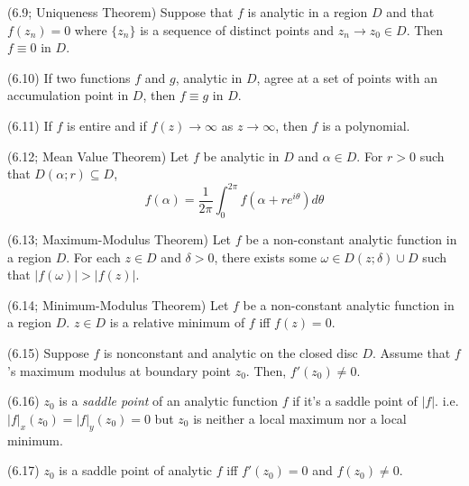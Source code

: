 \documentclass{article}
\begin{document}
\begin{property}(6.9; Uniqueness Theorem)
  Suppose that \(f\) is analytic in a region \(D\) and that \(f(z_n) = 0\)
  where \(\{z_n\}\) is a sequence of distinct points and \(z_n \to z_0 \in D\).
  Then \(f \equiv 0\) in \(D\).
\end{property}
\begin{corollary}(6.10)
  If two functions \(f\) and \(g\), analytic in \(D\),
  agree at a set of points with an accumulation point in \(D\),
  then \(f \equiv g\) in \(D\).
\end{corollary}

\begin{theorem}(6.11)
  If \(f\) is entire and if \(f(z) \to \infty\) as \(z \to \infty\),
  then \(f\) is a polynomial.
\end{theorem}

\begin{theorem}(6.12; Mean Value Theorem)
  Let \(f\) be analytic in \(D\) and \(\alpha \in D\).
  For \(r > 0\) such that \(D(\alpha; r) \subseteq D\),
  \[f(\alpha) = \frac{1}{2\pi}\int_{0}^{2\pi} f(\alpha + re^{i\theta})d\theta\]
\end{theorem}

\begin{theorem}(6.13; Maximum-Modulus Theorem)
  Let \(f\) be a non-constant analytic function in a region \(D\).
  For each \(z \in D\) and \(\delta > 0\), there exists some \(\omega \in D(z; \delta) \cup D\) such that \(|f(\omega)| > |f(z)|\).
\end{theorem}
\begin{corollary}(6.14; Minimum-Modulus Theorem)
  Let \(f\) be a non-constant analytic function in a region \(D\).
  \(z \in D\) is a relative minimum of \(f\) iff \(f(z) = 0\).
\end{corollary}
\begin{theorem}(6.15)
  Suppose \(f\) is nonconstant and analytic on the closed disc \(D\).
  Assume that \(f\)'s maximum modulus at boundary point \(z_0\).
  Then, \(f'(z_0) \neq 0\).
\end{theorem}

\begin{definition}(6.16)
  \(z_0\) is a \emph{saddle point} of an analytic function \(f\)
  if it's a saddle point of \(|f|\).
  i.e. \(|f|_x(z_0) = |f|_y(z_0) = 0\) but \(z_0\) is neither a local maximum
  nor a local minimum.
\end{definition}
\begin{theorem}(6.17)
  \(z_0\) is a saddle point of analytic \(f\) iff \(f'(z_0) = 0\) and \(f(z_0) \neq 0\).
\end{theorem}
\end{document}
